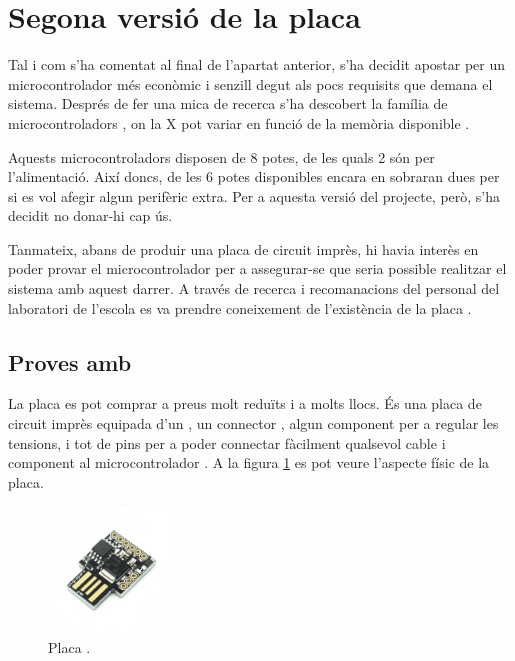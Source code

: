 \section{Segona versió de la placa}

Tal i com s'ha comentat al final de l'apartat anterior, s'ha decidit apostar
per un microcontrolador més econòmic i senzill degut als pocs requisits que
demana el sistema. Després de fer una mica de recerca s'ha descobert la
família de microcontroladors , on la X pot variar en funció de
la memòria  disponible \cite{AtTiny85}.

Aquests microcontroladors disposen de 8 potes, de les quals 2 són per
l'alimentació. Així doncs, de les 6 potes disponibles encara en sobraran dues
per si es vol afegir algun perifèric extra. Per a aquesta versió del projecte,
però, s'ha decidit no donar-hi cap ús.

Tanmateix, abans de produir una placa de circuit imprès, hi havia interès en
poder provar el microcontrolador per a assegurar-se que seria possible
realitzar el sistema amb aquest darrer. A través de recerca i recomanacions del
personal del laboratori de l'escola es va prendre coneixement de l'existència de
la placa .

\subsection{Proves amb }
\label{subsec:hw_digispark}

La placa  es pot comprar a preus molt reduïts i a molts llocs.
És una placa de circuit imprès equipada d'un , un connector
, algun component per a regular les tensions, i tot de pins per a
poder connectar fàcilment qualsevol cable i component al microcontrolador
\cite{Digispark}. A la figura \ref{fig:digispark} es pot veure l'aspecte físic
de la placa.

\begin{figure}[ht]
    \centering
    \includegraphics[width=0.3\textwidth]{images/modules/digisparkimg.png}
    \caption{Placa  \cite{Digispark}.}
    \label{fig:digispark}
\end{figure}

